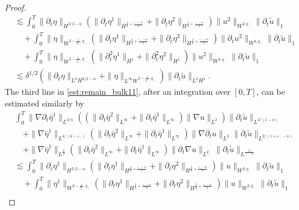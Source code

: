 \documentclass[letterpaper,reqno,10pt,twoside]{amsart}
\theoremstyle{definition}
\theoremstyle{remark}
\def\p{\partial}
\begin{document}
\begin{proof}
\begin{equation}
\begin{aligned}
					&\lesssim \int_0^T\|\p_t\eta\|_{H^{3/2-\alpha}}(\|\p_{t}\eta^{1}\|_{H^{\frac{3}{2}+\frac{\varepsilon_{-}-\alpha}{2}}}+\|\p_{t}\eta^{2}\|_{H^{\frac{3}{2}+\frac{\varepsilon_{-}-\alpha}{2}}})\|u^{2}\|_{W^{2,q_{-}}}\|\p_t\tilde{u}\|_1\\
					&\quad+\int_0^T\|\eta\|_{W^{3-\frac{1}{q_{-}},q_{-}}}(\|\p_{t}\eta^{1}\|_{H^{\frac{3}{2}+\frac{\varepsilon_{-}-\alpha}{2}}}+\|\p_{t}\eta^{2}\|_{H^{\frac{3}{2}+\frac{\varepsilon_{-}-\alpha}{2}}})\|\p_{t}u^{2}\|_{W^{2,q_{-}}}\|\p_t\tilde{u}\|_1\\
					&\quad+\int_0^T\|\eta\|_{W^{3-\frac{1}{q_{-}},q_{-}}}(\|\p_{t}^{2}\eta^{1}\|_{H^{1}}+\|\p_{t}^{2}\eta^{2}\|_{H^{1}})\|u^{2}\|_{W^{2,q_{-}}}\|\p_t\tilde{u}\|_1\\
					&\lesssim \delta^{1/2}(\|\p_t\eta\|_{L^2H^{3/2-\alpha}}+\|\eta\|_{L^{\infty}W^{3-\frac{1}{q_{-}},q_{-}}})\|\p_t\tilde{u}\|_{L^2H^1}.
				\end{aligned}
			\end{equation}
			The third line in \eqref{est:remain_bulk11}, after an integration over $[0, T]$, can be estimated similarly by
			\begin{equation}\label{est:remain_bulk13}
				\begin{aligned}
					&\int_0^T\|\nabla\p_t\bar{\eta}^{1}\|_{L^{2/\alpha}}((\|\p_{t}\bar{\eta}^2\|_{L^{\infty}}+\|\p_{t}\bar{\eta}^{1}\|_{L^{\infty}})\|\nabla{u}\|_{L^2}
					)\|\p_t\tilde{u}\|_{L^{2/(1-\alpha)}}\\
					&\quad+\|\nabla\bar{\eta}^{1}\|_{L^{4/(\alpha-\varepsilon_-)}}(\|\p_t\bar{\eta}^2\|_{L^{\infty}}+\|\p_{t}\bar{\eta}^{1}\|_{L^{\infty}})\|\nabla\p_{t}{u}\|_{L^{2}}\|\p_t\tilde{u}\|_{L^{2/(1+\varepsilon_{-}-\alpha)}}\\
					&\quad+\|\nabla\bar{\eta}^{1}\|_{L^{\frac{2}{\alpha}}}(\|\p_t\bar{\eta}^2\|_{L^{\infty}}+\|\p_{t}\bar{\eta}^{1}\|_{L^{\infty}})\|\p_{t}\nabla{u}\|_{L^{q_-}}\|\p_{t}\tilde{u}\|_{L^{\frac{2}{\varepsilon_{-}-\alpha}}}\\
					&\lesssim \int_0^T\|\p_t\eta^{1}\|_{H^{3/2-\alpha}}(\|\p_{t}\eta^{1}\|_{H^{\frac{3}{2}+\frac{\varepsilon_{-}-\alpha}{2}}}+\|\p_{t}\eta^{2}\|_{H^{\frac{3}{2}+\frac{\varepsilon_{-}-\alpha}{2}}})\|u\|_{W^{2,q_{-}}}\|\p_t\tilde{u}\|_1\\
					&\quad+\int_0^T\|\eta^{1}\|_{W^{3-\frac{1}{q_{-}},q_{-}}}(\|\p_{t}\eta^{1}\|_{H^{\frac{3}{2}+\frac{\varepsilon_{-}-\alpha}{2}}}+\|\p_{t}\eta^{2}\|_{H^{\frac{3}{2}+\frac{\varepsilon_{-}-\alpha}{2}}})\|u\|_{W^{2,q_{-}}}\|\p_t\tilde{u}\|_1\\

\end{aligned}
\end{equation}
\end{proof}
\end{document}
